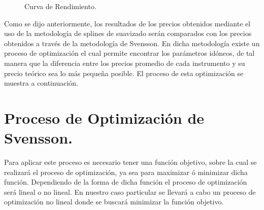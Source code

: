\begin{figure}[h]
\caption{Curva de Rendimiento.}
\label{c_rend}
\end{figure}

\hspace{0.4cm} Como se dijo anteriormente, los resultados de los precios obtenidos mediante el uso de la metodolog\'ia de splines de suavizado ser\'an comparados con los precios obtenidos a trav\'es de la metodolog\'ia de Svensson. En dicha metodolog\'ia existe un proceso de optimizaci\'on el cual permite encontrar los par\'ametros id\'oneos, de tal manera que la diferencia entre los precios promedio de cada instrumento y su precio te\'orico sea lo m\'as peque\~na posible. El proceso de esta optimizaci\'on se muestra a continuaci\'on.



\section{Proceso de Optimizaci\'on de Svensson.}


\hspace{0.4cm} Para aplicar este proceso es necesario tener una funci\'on objetivo, sobre la cual se realizar\'a el proceso de optimizaci\'on, ya sea para maximizar \'o minimizar dicha funci\'on. Dependiendo de la forma de dicha funci\'on el proceso de optimizaci\'on ser\'a lineal o no lineal. En nuestro caso particular se llevar\'a a cabo un proceso de optimizaci\'on no lineal donde se buscar\'a minimizar la funci\'on objetivo.

